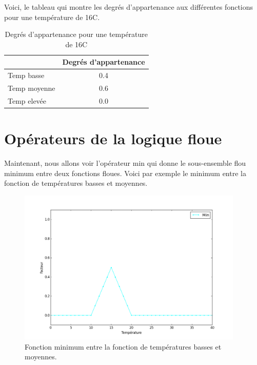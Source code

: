 \documentclass[a4paper,11pt]{article}
\begin{document}
Voici, le tableau qui montre les degrés d'appartenance aux différentes 
fonctions pour une température de 16\degre C.

\begin{table}[H]
  \begin{center}
    \begin{tabular}{|l|c|}
      \hline
       & Degrés d'appartenance \\
      \hline
      \hline
      Temp basse & 0.4 \\
      \hline
      Temp moyenne & 0.6 \\
      \hline
      Temp elevée & 0.0\\
      \hline
    \end{tabular}
    \caption{Degrés d'appartenance pour une température de 16\degre C}
  \end{center}
\end{table}


\newpage

\section{Opérateurs de la logique floue}

Maintenant, nous allons voir l'opérateur min qui donne le sous-ensemble 
flou minimum entre deux fonctions floues. Voici par exemple le 
minimum entre la fonction de températures basses et moyennes.

\begin{figure}[H]
  \begin{center}
  \includegraphics[height=280px]{images/min.png}
  \caption{Fonction minimum entre la fonction de températures basses et moyennes.}
  \end{center}
\end{figure}
\end{document}

